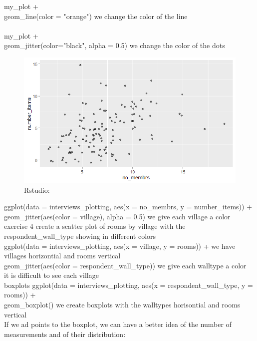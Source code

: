 \documentclass{article}
\begin{document}
my\_plot +\\
  geom\_line(color = "orange")   we change the color of the line\\\\

my\_plot +\\
  geom\_jitter(color="black", alpha = 0.5)   we change the color of the dots\\
\begin{figure}[H]
    \centering
    \includegraphics[width=\textwidth]{Rplot.png}
    \caption{Rstudio:}
    \label{fig:bil10}  
\end{figure}

ggplot(data = interviews\_plotting, aes(x = no\_membrs, y = number\_items)) +\\
  geom\_jitter(aes(color = village), alpha = 0.5)   we give each village a color\\

 exercise 4 create a scatter plot of rooms by village with the respondent\_wall\_type showing in different colors\\
ggplot(data = interviews\_plotting, aes(x = village, y = rooms)) +   we have villages horizontial and rooms vertical\\
  geom\_jitter(aes(color = respondent\_wall\_type))   we give each walltype a color\\
  it is difficult to see each village\\

  boxplots
ggplot(data = interviews\_plotting, aes(x = respondent\_wall\_type, y = rooms)) +\\
  geom\_boxplot()   we create boxplots with the walltypes horisontial and rooms vertical\\
  If we ad points to the boxplot, we can have a better idea of the number of measurements and of their distribution:\\
  
\end{document}
